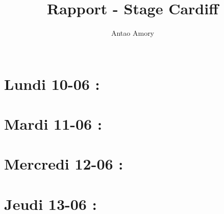 \documentclass{article}
\title{Rapport - Stage Cardiff}
\author{Antao Amory}
\date{$\quad$}
\begin{document}
\maketitle
\section*{Lundi 10-06 :}
\section*{Mardi 11-06 :}
\section*{Mercredi 12-06 :}
\section*{Jeudi 13-06 :}
\end{document}
